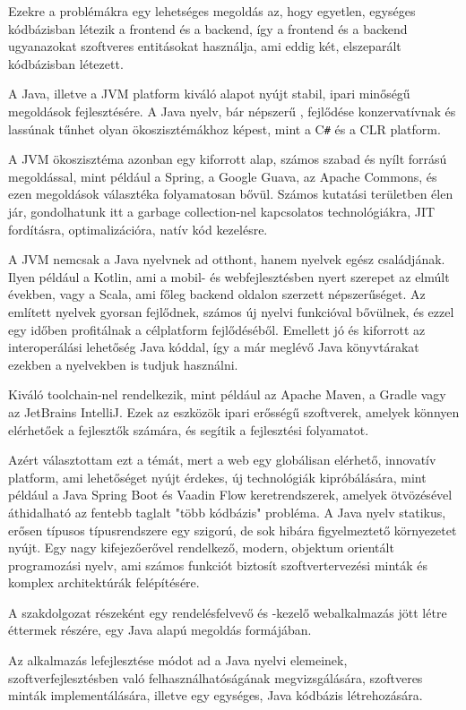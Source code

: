 Ezekre a problémákra egy lehetséges megoldás az, hogy egyetlen, egységes kódbázisban létezik a frontend és a backend, így a frontend és a backend ugyanazokat szoftveres entitásokat használja, ami eddig két, elszeparált kódbázisban létezett.\par

A Java, illetve a JVM platform kiváló alapot nyújt stabil, ipari minőségű megoldások fejlesztésére. A Java nyelv, bár népszerű \cite{tiobeIndex}, fejlődése konzervatívnak és lassúnak tűnhet olyan ökoszisztémákhoz képest, mint a C\verb|#| és a CLR platform. \par

A JVM ökoszisztéma azonban egy kiforrott alap, számos szabad és nyílt forrású megoldással, mint például a Spring, a Google Guava, az Apache Commons, és ezen megoldások választéka folyamatosan bővül. Számos kutatási területben élen jár, gondolhatunk itt a garbage collection-nel kapcsolatos technológiákra, JIT fordításra, optimalizációra, natív kód kezelésre.
\par

A JVM nemcsak a Java nyelvnek ad otthont, hanem nyelvek egész családjának. Ilyen például a Kotlin, ami a mobil- és webfejlesztésben nyert szerepet az elmúlt években, vagy a Scala, ami főleg backend oldalon szerzett népszerűséget. Az említett nyelvek gyorsan fejlődnek, számos új nyelvi funkcióval bővülnek, és ezzel egy időben profitálnak a célplatform fejlődéséből. Emellett jó és kiforrott az interoperálási lehetőség Java kóddal, így a már meglévő Java könyvtárakat ezekben a nyelvekben is tudjuk használni. \par

Kiváló toolchain-nel rendelkezik, mint például az Apache Maven, a Gradle vagy az JetBrains IntelliJ. Ezek az eszközök ipari erősségű szoftverek, amelyek könnyen elérhetőek a fejlesztők számára, és segítik a fejlesztési folyamatot. \par

Azért választottam ezt a témát, mert a web egy globálisan elérhető, innovatív platform, ami lehetőséget nyújt érdekes, új technológiák kipróbálására, mint például a Java Spring Boot és Vaadin Flow keretrendszerek, amelyek ötvözésével áthidalható az fentebb taglalt "több kódbázis" probléma. A Java nyelv statikus, erősen típusos típusrendszere egy szigorú, de sok hibára figyelmeztető környezetet nyújt. Egy nagy kifejezőerővel rendelkező, modern, objektum orientált programozási nyelv, ami számos funkciót biztosít szoftvertervezési minták és komplex architektúrák felépítésére. \par

A szakdolgozat részeként egy rendelésfelvevő és -kezelő webalkalmazás jött létre éttermek részére, egy Java alapú megoldás formájában. \par

Az alkalmazás lefejlesztése módot ad a Java nyelvi elemeinek, szoftverfejlesztésben való felhasználhatóságának megvizsgálására, szoftveres minták implementálására, illetve egy egységes, Java kódbázis létrehozására. \par
